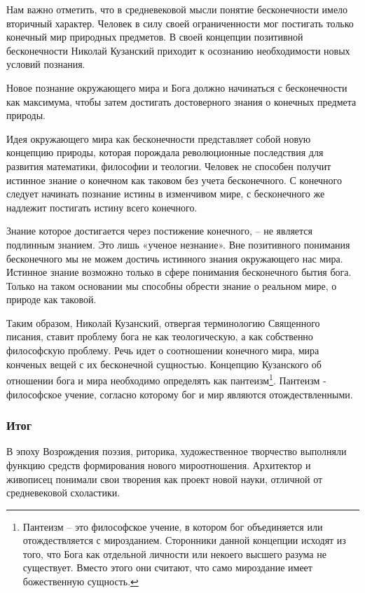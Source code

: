 \documentclass[a4paper, 14pt]{extreport}
\begin{document}
Нам важно отметить, что в средневековой мысли понятие бесконечности
имело вторичный характер. Человек в силу своей ограниченности мог
постигать только конечный мир природных предметов. В своей концепции
позитивной бесконечности Николай Кузанский приходит к осознанию
необходимости новых условий познания.

Новое познание окружающего мира и Бога должно начинаться с бесконечности
как максимума, чтобы затем достигать достоверного знания о конечных
предмета природы.

Идея окружающего мира как бесконечности представляет собой новую
концепцию природы, которая порождала революционные последствия для
развития математики, философии и теологии. Человек не способен получит
истинное знание о конечном как таковом без учета бесконечного. С
конечного следует начинать познание истины в изменчивом мире, с
бесконечного же надлежит постигать истину всего конечного.

Знание которое достигается через постижение конечного, -- не является
подлинным знанием. Это лишь «ученое незнание». Вне позитивного понимания
бесконечного мы не можем достичь истинного знания окружающего нас мира.
Истинное знание возможно только в сфере понимания бесконечного бытия
бога. Только на таком основании мы способны обрести знание о реальном
мире, о природе как таковой.

Таким образом, Николай Кузанский, отвергая терминологию Священного
писания, ставит проблему бога не как теологическую, а как собственно
философскую проблему. Речь идет о соотношении конечного мира, мира
конченых вещей с их бесконечной сущностью. Концепцию Кузанского об
отношении бога и мира необходимо определять как пантеизм\footnote{Пантеизм
  -- это философское учение, в котором бог объединяется или
  отождествляется с мирозданием. Сторонники данной концепции исходят из
  того, что Бога как отдельной личности или некоего высшего разума не
  существует. Вместо этого они считают, что само мироздание имеет
  божественную сущность.}. Пантеизм - философское учение, согласно
которому бог и мир являются отождествленными.

\subsubsection{Итог}

В эпоху Возрождения поэзия, риторика, художественное творчество
выполняли функцию средств формирования нового мироотношения. Архитектор
и живописец понимали свои творения как проект новой науки, отличной от
средневековой схоластики.
\end{document}
